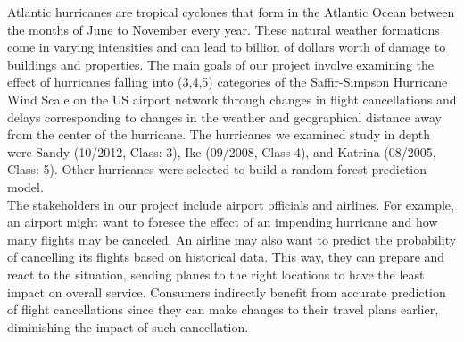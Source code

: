 
Atlantic hurricanes are tropical cyclones that form in the Atlantic Ocean between the months of June to November every year. These natural weather formations come in varying intensities and can lead to billion of dollars worth of damage to buildings and properties. The main goals of our project involve examining the effect of hurricanes falling into (3,4,5) categories of the Saffir-Simpson Hurricane Wind Scale on the US airport network through changes in flight cancellations and delays corresponding to changes in the weather and geographical distance away from the center of the hurricane. The hurricanes we examined study in depth were Sandy (10/2012, Class: 3), Ike (09/2008, Class 4), and Katrina (08/2005, Class: 5). Other hurricanes were selected to build a random forest prediction model. \\

The stakeholders in our project include airport officials and airlines. For example, an airport might want to foresee the effect of an impending hurricane and how many flights may be canceled. An airline may also want to predict the probability of cancelling its flights based on historical data. This way, they can prepare and react to the situation, sending planes to the right locations to have the least impact on overall service. Consumers indirectly benefit from accurate prediction of flight cancellations since they can make changes to their travel plans earlier, diminishing the impact of such cancellation.